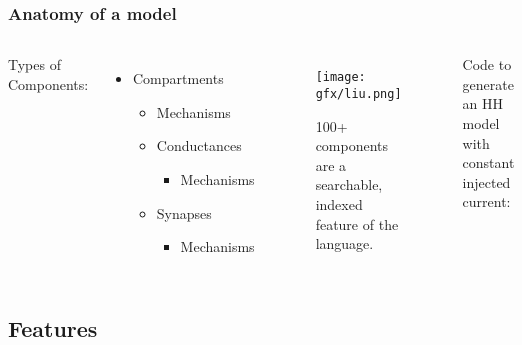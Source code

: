 \documentclass{beamer}
\begin{document}
\begin{frame}[fragile]
  \frametitle{Anatomy of a model}

  \begin{columns}

    Types of Components:

    \begin{itemize}
      \item Compartments
      \begin{itemize}
        \item Mechanisms
      \end{itemize}
      \begin{itemize}
        \item Conductances
        \begin{itemize}
          \item Mechanisms
        \end{itemize}
        \item Synapses
        \begin{itemize}
          \item Mechanisms
        \end{itemize}
      \end{itemize}
    \end{itemize}


    \begin{figure}
      \texttt{[image: gfx/liu.png]}
      \centering
      \caption{100+ components are a searchable, indexed feature of the language.}
    \end{figure}


    Code to generate an HH model with constant injected current:

    \resizebox{\textwidth}{!}{}

  \end{columns}

\end{frame}

\subsection{Features}

\end{document}
